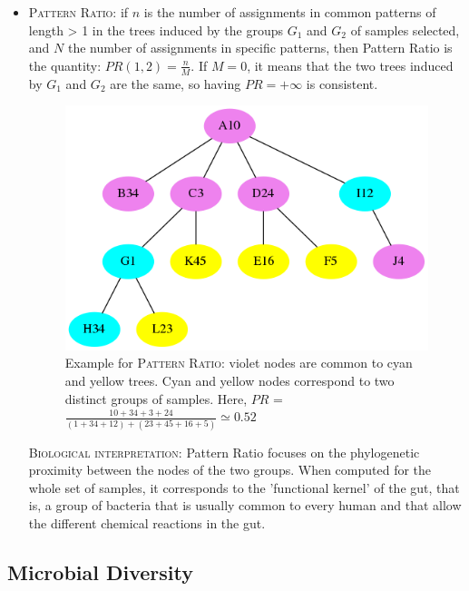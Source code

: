 \documentclass{report}
\begin{document}
\begin{itemize} 
\item \textsc{Pattern Ratio:} if $n$ is the number of assignments in common patterns of length > 1 in the trees induced by the groups $G_{1}$ and $G_{2}$ of samples selected, and $N$ the number of assignments in specific patterns, then Pattern Ratio is the quantity: $PR(1,2) = \frac{n}{M}$. If $M = 0$, it means that the two trees induced by $G_{1}$ and $G_{2}$ are the same, so having $PR = +\infty$ is consistent.

\begin{figure}[H]
\centering
\includegraphics[scale=0.5]{illustrations/patternratio.png}
\caption{Example for \textsc{Pattern Ratio}: violet nodes are common to cyan and yellow trees. Cyan and yellow nodes correspond to two distinct groups of samples. Here, $PR$ = $\frac{10 + 34 + 3 + 24}{(1 + 34 + 12) + (23 + 45 + 16 + 5)} \simeq 0.52$}
\end{figure}

\bigskip

  \textsc{Biological interpretation:} Pattern Ratio focuses on the phylogenetic proximity between the nodes of the two groups. When computed for the whole set of samples, it corresponds to the 'functional kernel' of the gut, that is, a group of bacteria that is usually common to every human and that allow the different chemical reactions in the gut. 

\end{itemize}

\subsection{Microbial Diversity}
\end{document}
